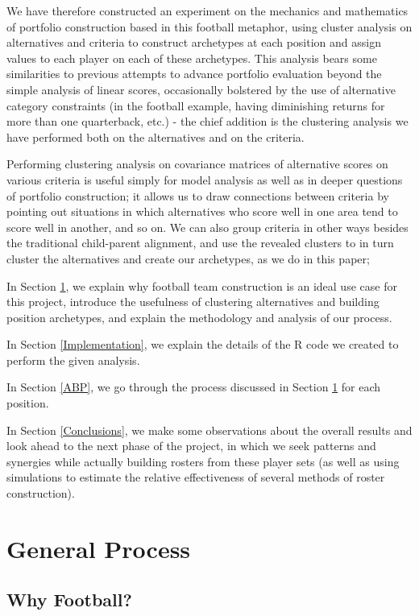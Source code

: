 \documentclass[11pt]{article}
\begin{document}
We have therefore constructed an experiment on the mechanics and mathematics of portfolio construction based in this football metaphor, using cluster analysis on alternatives and criteria to construct archetypes at each position and assign values to each player on each of these archetypes. This analysis bears some similarities to previous attempts to advance portfolio evaluation beyond the simple analysis of linear scores, occasionally bolstered by the use of alternative category constraints (in the football example, having diminishing returns for more than one quarterback, etc.) - the chief addition is the clustering analysis we have performed both on the alternatives and on the criteria.

Performing clustering analysis on covariance matrices of alternative scores on various criteria is useful simply for model analysis as well as in deeper questions of portfolio construction; it allows us to draw connections between criteria by pointing out situations in which alternatives who score well in one area tend to score well in another, and so on. We can also group criteria in other ways besides the traditional child-parent alignment, and use the revealed clusters to in turn cluster the alternatives and create our archetypes, as we do in this paper; 

In Section \ref{GenPro}, we explain why football team construction is an ideal use case for this project, introduce the usefulness of clustering alternatives and building position archetypes, and explain the methodology and analysis of our process.

In Section \ref{Implementation}, we explain the details of the R code we created to
perform the given analysis.

In Section \ref{ABP}, we go through the process discussed in Section \ref{GenPro} for each position.

In Section \ref{Conclusions}, we make some observations about the overall results and look ahead to the next phase of the project, in which we seek patterns and synergies while actually building rosters from these player sets (as well as using simulations to estimate the relative effectiveness of several methods of roster construction).


\section{General Process}
\label{GenPro}

\subsection{Why Football?}
\end{document}
